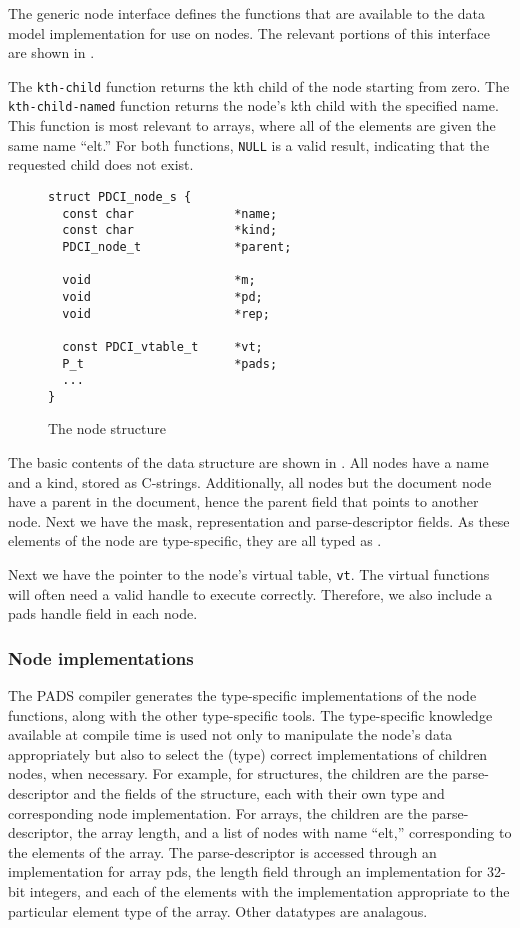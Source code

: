 The generic node interface defines the functions that are available to the
\pads{} data model implementation for use on nodes. The relevant portions of
this interface are shown in .

The {\tt kth-child} function returns the kth child of the node
starting from zero. The {\tt kth-child-named} function returns the node's kth
child with the specified name. This function is most relevant to
arrays, where all of the elements are given the same name ``elt.''
For both functions, {\tt NULL} is a valid result, indicating that the
requested child does not exist.

\begin{figure}
{\small
\begin{verbatim}
struct PDCI_node_s {
  const char              *name;
  const char              *kind;
  PDCI_node_t             *parent;

  void                    *m;
  void                    *pd;
  void                    *rep;

  const PDCI_vtable_t     *vt;
  P_t                     *pads;
  ...
}
\end{verbatim}
}
\caption{The node structure}
\label{fig:node-struct}
\end{figure}

The basic contents of the  data structure are shown in
. All nodes have a name and a kind, stored as
C-strings. Additionally, all nodes but the document node have a parent
in the document, hence the parent field that points to another node.
Next we have the mask, representation and parse-descriptor fields. As
these elements of the node are type-specific, they are all typed as
\vptr.

Next we have the pointer to the node's virtual table, {\tt vt}. The
virtual functions will often need a valid \pads handle to execute
correctly. Therefore, we also include a pads handle field in each
node.

\subsubsection{Node implementations}
The PADS compiler generates the type-specific implementations of the
node functions, along with the other type-specific tools.  The
type-specific knowledge available at compile time is used not only to
manipulate the node's data appropriately but also to select the (type)
correct implementations of children nodes, when necessary.  For
example, for structures, the children are the parse-descriptor and the
fields of the structure, each with their own type and corresponding
node implementation.  For arrays, the children are the
parse-descriptor, the array length, and a list of nodes with name
``elt,'' corresponding to the elements of the array. The
parse-descriptor is accessed through an implementation for array pds,
the length field through an implementation for 32-bit integers, and
each of the elements with the implementation appropriate to the
particular element type of the array. Other datatypes are analagous.

